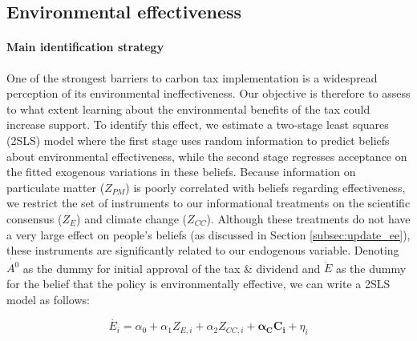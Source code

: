 \documentclass[12pt]{article} %
\begin{document}
\subsection{Environmental effectiveness}\label{subsec:motive_ee}

\paragraph{Main identification strategy}


One of the strongest barriers to carbon tax implementation is a widespread perception of its environmental ineffectiveness. Our objective is therefore to assess to what extent learning about the environmental benefits of the tax could increase support. To identify this effect, we estimate a two-stage least squares (2SLS) model where the first stage uses random information to predict beliefs about environmental effectiveness, while the second stage regresses acceptance on the fitted exogenous variations in these beliefs. Because information on particulate matter ($Z_{PM}$) is poorly correlated with beliefs regarding effectiveness, we restrict the set of instruments to our informational treatments on the scientific consensus ($Z_{E}$) and climate change ($Z_{CC}$). Although these treatments do not have a very large effect on people's beliefs (as discussed in Section \ref{subsec:update_ee}), these instruments are significantly related to our endogenous variable. Denoting $\dot{A^0}$ as the dummy for initial approval of the tax \& dividend and $\dot{E}$ as the dummy for the belief that the policy is environmentally effective, we can write a 2SLS model as follows:

\begin{equation}
    \dot{E_i} = \alpha_0 + \alpha_1 Z_{E,i} + \alpha_2 Z_{CC,i} + \mathbf{\alpha_C C_i}  + \eta_i
    \label{eq:first_stage_parametric_rdd_approve_effective}
\end{equation}
\end{document}
